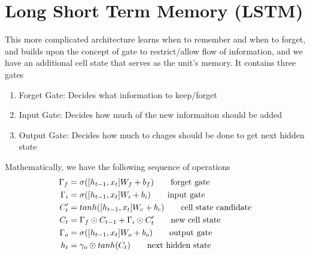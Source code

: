 \documentclass[../../deep_learning_notes.tex]{subfiles}
\begin{document}
\section{Long Short Term Memory (LSTM)}
This more complicated architecture learns when to remember and when to forget, and builds upon the concept of gate to restrict/allow flow of information, and we have an additional cell state that serves as the unit's memory. It contains three gates
\begin{enumerate}
    \item Forget Gate: Decides what information to keep/forget
    \item Input Gate: Decides how much of the new informaiton should be added
    \item Output Gate: Decides how much to chages should be done to get next hidden state
\end{enumerate}
Mathematically, we have the following sequence of operations
\begin{align*}
    \Gamma_{f} &= \sigma([h_{t-1}, x_{t}]W_{f} + b_{f}) \tag*{\text{forget gate}}\\
    \Gamma_{i} &= \sigma([h_{t-1}, x_{t}]W_{i} + b_{i}) \tag*{\text{input gate}}\\
    C_{t}^{\prime} &= tanh([h_{t-1}, x_{t}]W_{c} + b_{c}) \tag*{\text{cell state candidate}}\\
    C_{t} &= \Gamma_{f} \odot C_{t-1} + \Gamma_{i} \odot C_{t}^{\prime} \tag*{\text{new cell state}}\\
    \Gamma_{o} &= \sigma([h_{t-1}, x_{t}]W_{o} + b_{o}) \tag*{\text{output gate}}\\
    h_{t} &= \gamma_{o} \odot tanh(C_{t}) \tag*{\text{next hidden state}}
\end{align*}
\end{document}

